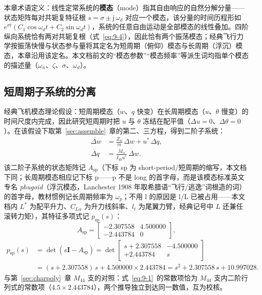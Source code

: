 \documentclass[11pt,a4paper]{ctexart}
\newcommand{\ud}[1]{\dot{#1}}
\begin{document}
本章术语定义：线性定常系统的\textbf{模态}（mode）指其自由响应的自然分解分量——状态矩阵每对共轭复特征根 $s=\sigma\pm\mathrm{j}\,\omega_d$ 对应一个模态，该分量的时间历程形如 $e^{\sigma t}\left(C_1\cos\omega_d t + C_2\sin\omega_d t\right)$，系统的任意自由运动是全部模态的线性叠加。四阶纵向系统恰有两对共轭复根（式~\eqref{eq:9-4}），因此恰有两个振荡模态；经典飞行力学按振荡快慢与状态参与量将其定名为短周期（俯仰）模态与长周期（浮沉）模态，本章沿用该定名。本文档前文的“模态参数”“模态频率”等派生词均指单个模态的描述量（$\omega_n$、$\zeta$、$\sigma$、$\omega_d$）。

\subsection{短周期子系统的分离}

经典飞机模态理论假设：短周期模态（$w$、$q$ 快变）在长周期模态（$u$、$\theta$ 慢变）的时间尺度内完成，因此研究短周期时把 $u$ 与 $\theta$ 冻结在配平值（$\Delta u=0$、$\Delta\theta=0$）。在该假设下取第~\ref{sec:assemble}~章的第二、三方程，得到二阶子系统：
\begin{align*}
\ud{\Delta w} &= \frac{Z_w}{m}\,\Delta w + u^{*}\,\Delta q,\\
\ud{\Delta q} &= \frac{M_\alpha}{I_{yy}u^{*}}\,\Delta w.
\end{align*}
该二阶子系统的状态矩阵记 $A_{\mathrm{sp}}$（下标 sp 为 short-period/短周期的缩写，本文档下同；长周期模态相应记下标 p——p 不是 long 的首字母，而是该模态标准英文专名 \emph{phugoid}（浮沉模态，Lanchester 1908 年取希腊语``飞行/逃逸''词根造的词）的首字母，教材惯例记长周期频率为 $\omega_p$；不用 l 的原因是 l/L 已被占用——本文档内 $L^{*}$ 为配平升力、$C_{L\alpha}$ 为升力线斜率、$l_t$ 为尾翼力臂，经典记号中 $L$ 还兼任滚转力矩），其特征多项式记 $p_{\mathrm{sp}}(s)$：
\[
A_{\mathrm{sp}} =
\begin{bmatrix} -2.307558 & 4.500000 \\ -2.443784 & 0 \end{bmatrix},
\]
\begin{align}
p_{\mathrm{sp}}(s) &= \det(s\mathbf{I}-A_{\mathrm{sp}})
= \det\begin{bmatrix} s+2.307558 & -4.500000 \\ +2.443784 & s \end{bmatrix}
\nonumber\\
&= (s+2.307558)\,s + 4.500000\times 2.443784
= s^2 + 2.307558\,s + 10.997028.
\label{eq:9-1}\tag{(9-1)}
\end{align}
与第~\ref{sec:charpoly}~章 $M_{44}$ 支的对照：式~\eqref{eq:9-1}~的常数项恰为 $M_{44}$ 支内二阶行列式的常数项（$4.5\times 2.443784$），两个推导独立到达同一数值，互为校核。
\end{document}
